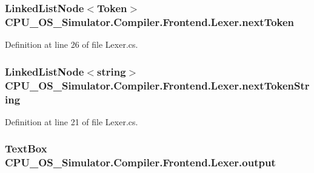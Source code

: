 \subsubsection[{next\+Token}]{\setlength{\rightskip}{0pt plus 5cm}Linked\+List\+Node$<${\bf Token}$>$ C\+P\+U\+\_\+\+O\+S\+\_\+\+Simulator.\+Compiler.\+Frontend.\+Lexer.\+next\+Token\hspace{0.3cm}{\ttfamily [private]}}\label{class_c_p_u___o_s___simulator_1_1_compiler_1_1_frontend_1_1_lexer_a9bdd0bc4e775f8708a1efebd0e84bc7c}


Definition at line 26 of file Lexer.\+cs.

\hypertarget{class_c_p_u___o_s___simulator_1_1_compiler_1_1_frontend_1_1_lexer_a6795b61d4a157858e6471adb636a16f0}{}
\subsubsection[{next\+Token\+String}]{\setlength{\rightskip}{0pt plus 5cm}Linked\+List\+Node$<$string$>$ C\+P\+U\+\_\+\+O\+S\+\_\+\+Simulator.\+Compiler.\+Frontend.\+Lexer.\+next\+Token\+String\hspace{0.3cm}{\ttfamily [private]}}\label{class_c_p_u___o_s___simulator_1_1_compiler_1_1_frontend_1_1_lexer_a6795b61d4a157858e6471adb636a16f0}


Definition at line 21 of file Lexer.\+cs.

\hypertarget{class_c_p_u___o_s___simulator_1_1_compiler_1_1_frontend_1_1_lexer_ab2c4e18875ad66f9f4b1debf32e21d97}{}
\subsubsection[{output}]{\setlength{\rightskip}{0pt plus 5cm}Text\+Box C\+P\+U\+\_\+\+O\+S\+\_\+\+Simulator.\+Compiler.\+Frontend.\+Lexer.\+output\hspace{0.3cm}{\ttfamily [private]}}\label{class_c_p_u___o_s___simulator_1_1_compiler_1_1_frontend_1_1_lexer_ab2c4e18875ad66f9f4b1debf32e21d97}


